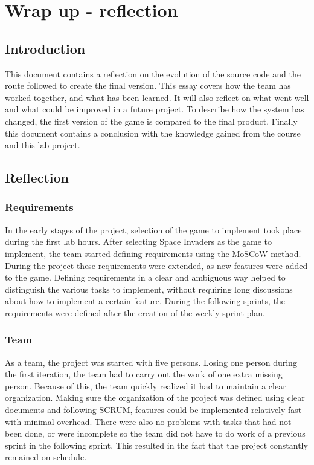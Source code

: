 \section{Wrap up - reflection }
\subsection*{Introduction}
This document contains a reflection on the evolution of the source code and the route followed to create the final version. 
This essay covers how the team has worked together, and what has been learned. It will also reflect on what went well and what could be improved in a future project. To describe how the system has changed, the first version of the game is compared to the final product. Finally this document contains a conclusion with the knowledge gained from the course and this lab project.

\newpage
\subsection*{Reflection}
\subsubsection*{Requirements}
In the early stages of the project, selection of the game to implement took place during the first lab hours. After selecting Space Invaders as the game to implement, the team started defining requirements using the MoSCoW method. During the project these requirements were extended, as new features were added to the game. Defining requirements in a clear and ambiguous way helped to distinguish the various tasks to implement, without requiring long discussions about how to implement a certain feature. During the following sprints, the requirements were defined after the creation of the weekly sprint plan.

\subsubsection*{Team}
As a team, the project was started with five persons. Losing one person during the first iteration, the team had to carry out the work of one extra missing person. Because of this, the team quickly realized it had to maintain a clear organization. Making sure the organization of the project was defined using clear documents and following SCRUM, features could be implemented relatively fast with minimal overhead. There were also no problems with tasks that had not been done, or were incomplete so the team did not have to do work of a previous sprint in the following sprint. This resulted in the fact that the project constantly remained on schedule.

